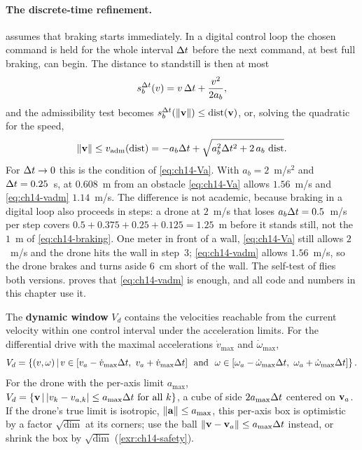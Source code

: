 \paragraph{The discrete-time refinement.}
 assumes that braking starts immediately. In a
digital control loop the chosen command is held for the whole interval $\Delta t$
before the next command, at best full braking, can begin. The distance to
standstill is then at most
\begin{equation}
  s_b^{\Delta t}(v) = v\,\Delta t + \frac{v^2}{2 a_b},
  \label{eq:ch14-braking-discrete}
\end{equation}
and the admissibility test becomes $s_b^{\Delta t}(\left\lVert \mathbf{v} \right\rVert) \le \operatorname{dist}(\mathbf{v})$,
or, solving the quadratic for the speed,
\begin{equation}
  \left\lVert \mathbf{v} \right\rVert \le v_{\mathrm{adm}}(\operatorname{dist}) = -a_b\Delta t + \sqrt{a_b^2\Delta t^2 + 2\,a_b\,\operatorname{dist}}.
  \label{eq:ch14-vadm}
\end{equation}
For $\Delta t \to 0$ this is the condition of \cref{eq:ch14-Va}. With
$a_b = 2$~m/s$^2$ and $\Delta t = 0.25$~s, at $0.608$~m from an obstacle
\cref{eq:ch14-Va} allows $1.56$~m/s and \cref{eq:ch14-vadm} $1.14$~m/s. The
difference is not academic, because braking in a digital loop also proceeds
in steps: a drone at $2$~m/s that loses $a_b\Delta t = 0.5$~m/s per step covers
$0.5 + 0.375 + 0.25 + 0.125 = 1.25$~m before it stands still, not the $1$~m
of \cref{eq:ch14-braking}. One meter in front of a wall, \cref{eq:ch14-Va}
still allows $2$~m/s and the drone hits the wall in step~3;
\cref{eq:ch14-vadm} allows $1.56$~m/s, so the drone brakes and turns aside
$6$~cm short of the wall. The self-test of  flies both
versions.  proves that \cref{eq:ch14-vadm} is
enough, and all code and numbers in this chapter use it.

\begin{definition}
\label{def:ch14-window}
The \textbf{dynamic window}
$V_d$ contains the velocities reachable from the current velocity within one
control interval under the acceleration limits. For the differential drive
with the maximal accelerations $\dot v_{\max}$ and $\dot\omega_{\max}$,
\begin{equation}
  V_d = \left\{ (v, \omega) \,\middle|\,
    v \in [v_a - \dot v_{\max}\Delta t,\ v_a + \dot v_{\max}\Delta t]
    \ \text{ and }\
    \omega \in [\omega_a - \dot\omega_{\max}\Delta t,\ \omega_a + \dot\omega_{\max}\Delta t] \right\}.
  \label{eq:ch14-Vd}
\end{equation}
For the drone with the per-axis limit $a_{\max}$,
$V_d = \left\{ \mathbf{v} \,\middle|\, \left\lvert v_k - v_{a,k} \right\rvert \le a_{\max}\Delta t \text{ for all } k \right\}$,
a cube of side $2 a_{\max}\Delta t$ centered on $\mathbf{v}_a$. If the drone's true limit
is isotropic, $\left\lVert \mathbf{a} \right\rVert \le a_{\max}$, this per-axis box is optimistic
by a factor $\sqrt{\dim}$ at its corners; use the ball
$\left\lVert \mathbf{v} - \mathbf{v}_a \right\rVert \le a_{\max}\Delta t$ instead, or shrink the box by
$\sqrt{\dim}$ (\cref{exr:ch14-safety}).
\end{definition}


